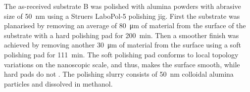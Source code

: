 
The as-received substrate B was polished with alumina powders with abrasive size of \SI{50}{\nano\metre} using a Struers LaboPol-5 polishing jig. First the substrate was planarised by removing an average of \SI{80}{\micro\metre} of material from the surface of the substrate with a hard polishing pad for \SI{200}{\minute}. Then a smoother finish was achieved by removing another \SI{30}{\micro\metre} of material from the surface using a soft polishing pad for \SI{111}{\minute}. The soft polishing pad conforms to local topology variations on the nanoscopic scale, and thus, makes the surface smooth, while hard pads do not \citep{lee2000nanotopography}. The polishing slurry consists of \SI{50}{\nano\metre} colloidal alumina particles and  dissolved in methanol.

